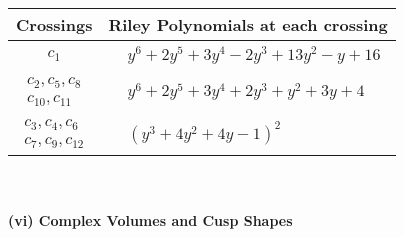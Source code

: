 \documentclass[1p]{elsarticle_modified}
\theoremstyle{definition}
\begin{document}
\begin{tabular}{m{50pt}|m{274pt}}
Crossings & \hspace{64pt}Riley Polynomials at each crossing \\
\hline $$\begin{aligned}c_{1}\end{aligned}$$&$\begin{aligned}
&y^6+2 y^5+3 y^4-2 y^3+13 y^2- y+16
\end{aligned}$\\
\hline $$\begin{aligned}c_{2},c_{5},c_{8}\\c_{10},c_{11}\end{aligned}$$&$\begin{aligned}
&y^6+2 y^5+3 y^4+2 y^3+y^2+3 y+4
\end{aligned}$\\
\hline $$\begin{aligned}c_{3},c_{4},c_{6}\\c_{7},c_{9},c_{12}\end{aligned}$$&$\begin{aligned}
&(y^3+4 y^2+4 y-1)^2
\end{aligned}$\\
\hline
\end{tabular}\\~\\
\newpage\flushleft \textbf{(vi) Complex Volumes and Cusp Shapes}
\end{document}
